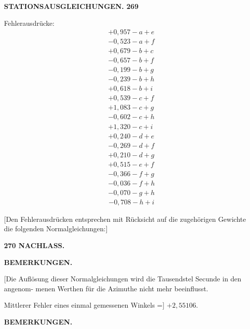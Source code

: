 \documentclass[12pt,a4paper]{article}
\theoremstyle{plain}
\theoremstyle{definition}
\theoremstyle{remark}
\begin{document}
\newpage

\noindent\textbf{STATIONSAUSGLEICHUNGEN. 269}

Fehlerausdr\"ucke:
\begin{align*}
&+0{,}957 - a + e \\
&-0{,}523 - a + f \\
&+0{,}679 - b + c \\
&-0{,}657 - b + f \\
&-0{,}199 - b + g \\
&-0{,}239 - b + h \\
&+0{,}618 - b + i \\
&+0{,}539 - c + f \\
&+1{,}083 - c + g \\
&-0{,}602 - c + h \\
&+1{,}320 - c + i \\
&+0{,}240 - d + e \\
&-0{,}269 - d + f \\
&+0{,}210 - d + g \\
&+0{,}515 - e + f \\
&-0{,}366 - f + g \\
&-0{,}036 - f + h \\
&-0{,}070 - g + h
\end{align*}
\begin{align*}
&-0{,}708 - h + i
\end{align*}

[Den Fehlerausdr\"ucken entsprechen mit R\"ucksicht auf die zugeh\"origen Gewichte die folgenden
Normalgleichungen:]

\newpage

\noindent\textbf{270 NACHLASS.}

\begin{center}
\textbf{BEMERKUNGEN.}\end{center}

[Die Aufl\"osung dieser Normalgleichungen wird die Tausendstel Secunde in den angenom-
menen Werthen f\"ur die Azimuthe nicht mehr beeinflusst.

Mittlerer Fehler eines einmal gemessenen Winkels =] $+2{,}55106$.

\medskip

\begin{center}
\textbf{BEMERKUNGEN.}\end{center}
\end{document}
